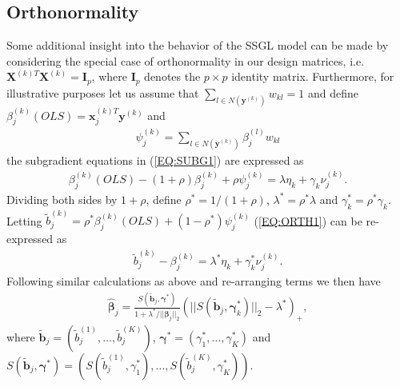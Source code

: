 \documentclass{article}
\numberwithin{equation}{section}
\theoremstyle{plain}
\newcommand{\bs}{\boldsymbol}
\begin{document}
\subsection{Orthonormality}
Some additional insight into the behavior of the SSGL model can be made by
considering the special case of orthonormality in our design matrices, i.e.
$\mathbf{X}^{(k)T} \mathbf{X}^{(k)} = \mathbf{I}_p$, where $\mathbf{I}_p$
denotes the $p \times p$ identity matrix. Furthermore, for illustrative purposes
let us assume that $\sum_{l \in N(\mathbf{y}^{(k)})} w_{kl} = 1$ and define
$\beta_j^{(k)}(OLS) = \mathbf{x}_j^{(k)T} \mathbf{y}^{(k)}$ and 
\begin{align}
\label{EQ:PSI}
\psi_j^{(k)} =
\sum_{l \in N(\mathbf{y}^{(k)})} \beta_j^{(l)}w_{kl} 
\end{align}
\noindent the subgradient equations
in (\ref{EQ:SUBG1}) are expressed as
\begin{align}
\label{EQ:ORTH1}
\beta_j^{(k)}(OLS) - (1 + \rho) \beta_j^{(k)} + \rho \psi_j^{(k)} = \lambda
\eta_k + \gamma_k \nu_j^{(k)}.
\end{align}
\noindent Dividing both sides by $1 + \rho$, define $\rho^{\ast} = 1/(1
+ \rho)$, $\lambda^{\ast} = \rho^{\ast} \lambda$ and $\gamma_k^{\ast} =
\rho^{\ast} \gamma_k$. Letting $\tilde{b}_j^{(k)} = \rho^{\ast}
\beta_j^{(k)}(OLS) + (1 - \rho^{\ast}) \psi_j^{(k)}$ (\ref{EQ:ORTH1}) can be
re-expressed as
\begin{align*}
\tilde{b}_j^{(k)} - \beta_j^{(k)} = \lambda^{\ast} \eta_k + \gamma_k^{\ast}
\nu_j^{(k)}.
\end{align*}
\noindent Following similar calculations as above and re-arranging terms we
then have
\begin{align}
\label{EQ:ORTH_SOL}
\hat{\bs\beta}_j = \frac{S(\tilde{\mathbf{b}}_j, \bs\gamma^{\ast})}{1 +
\lambda^{\ast}/||\bs\beta_j||_2}(||S(\tilde{\mathbf{b}}_j,
\bs\gamma_k^{\ast})||_2 - \lambda^{\ast})_+,
\end{align}
\noindent where $\tilde{\mathbf{b}}_j = (\tilde{b}_j^{(1)}, \ldots,
\tilde{b}_j^{(K)})$, $\bs\gamma^{\ast} = (\gamma_1^{\ast}, \ldots,
\gamma_K^{\ast})$ and $S(\tilde{\mathbf{b}}_j, \bs\gamma^{\ast}) =
(S(\tilde{b}_j^{(1)}, \gamma_1^{\ast}), \ldots, S(\tilde{b}_j^{(K)},
\gamma_K^{\ast}))$. 
\end{document}
